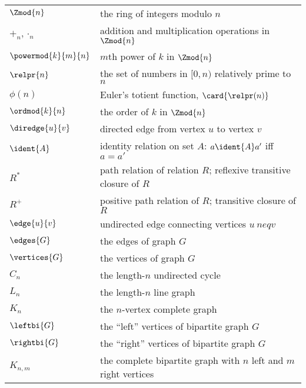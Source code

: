\begin{center}
\begin{tabular}{ll}
$\Zmod{n}$     & the ring of integers modulo $n$\\
$+_n, \cdot_n$ & addition and multiplication operations in $\Zmod{n}$\\
$\powermod{k}{m}{n}$  & $m$th power of $k$ in $\Zmod{n}$\\
$\relpr{n}$    & the set of numbers in $[0,n)$ relatively prime to $n$\\
$\phi(n)$      & Euler's totient function, $\card{\relpr(n)}$\\
$\ordmod{k}{n}$ & the order of $k$ in $\Zmod{n}$\\
$\diredge{u}{v}$ & directed edge from vertex $u$ to vertex $v$\\
$\ident{A}$    & identity relation on set $A$: $a \ident{A} a'$ iff $a = a'$\\
$R^*$          & path relation of relation $R$; reflexive transitive closure of $R$\\
$R^+$          & positive path relation of $R$; transitive closure of $R$\\
$\edge{u}{v}$  & undirected edge connecting vertices $u\ neq v$\\
$\edges{G}$    & the edges of graph $G$\\
$\vertices{G}$ & the vertices of graph $G$\\
$C_n$          & the length-$n$ undirected cycle\\
$L_n$          & the length-$n$ line graph\\
$K_n$          & the $n$-vertex complete graph\\
$\leftbi{G}$   & the ``left'' vertices of bipartite graph $G$\\
$\rightbi{G}$  & the ``right'' vertices of bipartite graph $G$\\
$K_{n,m}$       & the complete bipartite graph with $n$ left and $m$ right vertices\\
\end{tabular}
\end{center}


